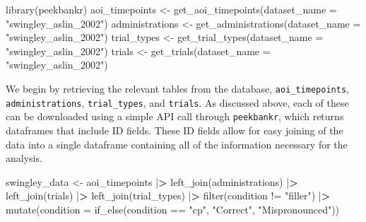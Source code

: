 \documentclass[
  english,
  man,floatsintext]{apa6}
\newenvironment{Shaded}{\begin{snugshade}}{\end{snugshade}}
\newcommand{\AttributeTok}[1]{\textcolor[rgb]{0.77,0.63,0.00}{#1}}
\newcommand{\ErrorTok}[1]{\textcolor[rgb]{0.64,0.00,0.00}{\textbf{#1}}}
\newcommand{\FunctionTok}[1]{\textcolor[rgb]{0.00,0.00,0.00}{#1}}
\newcommand{\NormalTok}[1]{#1}
\newcommand{\OtherTok}[1]{\textcolor[rgb]{0.56,0.35,0.01}{#1}}
\newcommand{\SpecialCharTok}[1]{\textcolor[rgb]{0.00,0.00,0.00}{#1}}
\newcommand{\StringTok}[1]{\textcolor[rgb]{0.31,0.60,0.02}{#1}}
\begin{document}
\singlespacing

\begin{Shaded}
\begin{Highlighting}[]
\FunctionTok{library}\NormalTok{(peekbankr)}
\NormalTok{aoi\_timepoints }\OtherTok{\textless{}{-}} \FunctionTok{get\_aoi\_timepoints}\NormalTok{(}\AttributeTok{dataset\_name =} \StringTok{"swingley\_aslin\_2002"}\NormalTok{)}
\NormalTok{administrations }\OtherTok{\textless{}{-}} \FunctionTok{get\_administrations}\NormalTok{(}\AttributeTok{dataset\_name =} \StringTok{"swingley\_aslin\_2002"}\NormalTok{)}
\NormalTok{trial\_types }\OtherTok{\textless{}{-}} \FunctionTok{get\_trial\_types}\NormalTok{(}\AttributeTok{dataset\_name =} \StringTok{"swingley\_aslin\_2002"}\NormalTok{)}
\NormalTok{trials }\OtherTok{\textless{}{-}} \FunctionTok{get\_trials}\NormalTok{(}\AttributeTok{dataset\_name =} \StringTok{"swingley\_aslin\_2002"}\NormalTok{)}
\end{Highlighting}
\end{Shaded}

\doublespacing

We begin by retrieving the relevant tables from the database, \texttt{aoi\_timepoints}, \texttt{administrations}, \texttt{trial\_types}, and \texttt{trials}. As discussed above, each of these can be downloaded using a simple API call through \texttt{peekbankr}, which returns dataframes that include ID fields. These ID fields allow for easy joining of the data into a single dataframe containing all of the information necessary for the analysis.

\singlespacing

\begin{Shaded}
\begin{Highlighting}[]
\NormalTok{swingley\_data }\OtherTok{\textless{}{-}}\NormalTok{ aoi\_timepoints }\SpecialCharTok{|}\ErrorTok{\textgreater{}}
  \FunctionTok{left\_join}\NormalTok{(administrations) }\SpecialCharTok{|}\ErrorTok{\textgreater{}}
  \FunctionTok{left\_join}\NormalTok{(trials) }\SpecialCharTok{|}\ErrorTok{\textgreater{}}
  \FunctionTok{left\_join}\NormalTok{(trial\_types) }\SpecialCharTok{|}\ErrorTok{\textgreater{}}
  \FunctionTok{filter}\NormalTok{(condition }\SpecialCharTok{!=} \StringTok{"filler"}\NormalTok{) }\SpecialCharTok{|}\ErrorTok{\textgreater{}}
  \FunctionTok{mutate}\NormalTok{(}\AttributeTok{condition =} \FunctionTok{if\_else}\NormalTok{(condition }\SpecialCharTok{==} \StringTok{"cp"}\NormalTok{, }\StringTok{"Correct"}\NormalTok{, }\StringTok{"Mispronounced"}\NormalTok{))}
\end{Highlighting}
\end{Shaded}
\end{document}

